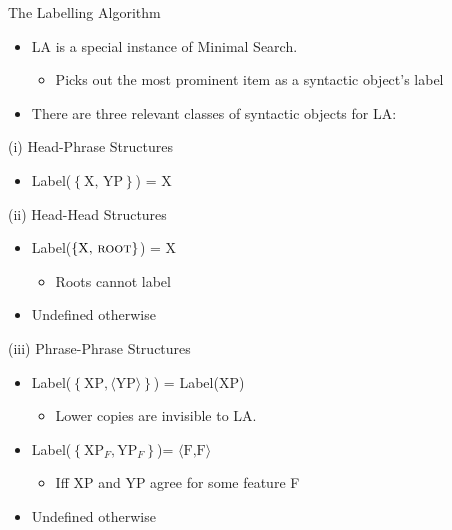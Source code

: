 \documentclass[Proposal]{subfiles}
\begin{document}
\begin{frame}
  {The Labelling Algorithm}
  \begin{itemize}
    \item LA is a special instance of Minimal Search.
      \begin{itemize}
	\item Picks out the most prominent item as a syntactic object's label
      \end{itemize}
      \pause
    \item There are three relevant classes of syntactic objects for LA:
  \end{itemize}
  \begin{overprint}
    \begin{block}
      {(i) Head-Phrase Structures}
      \begin{itemize}
	\item Label($\left\{ \text{X, YP} \right\}$) = X
      \end{itemize}
    \end{block}
    \begin{block}
      {(ii) Head-Head Structures}
      \begin{itemize}
	\item<4-5> Label($\left\{ \text{X, }\textsc{root} \right\}$) = X
	  \begin{itemize}
	    \item<4-5> Roots cannot label
	  \end{itemize}
	\item<5> Undefined otherwise
      \end{itemize}
    \end{block}
    \begin{block}
      {(iii) Phrase-Phrase Structures}
      \begin{itemize}
	\item<6-8> Label($\left\{ \text{XP}, \langle\text{YP}\rangle \right\}$) = Label(XP)
	  \begin{itemize}
	    \item<6-8> Lower copies are invisible to LA.
	  \end{itemize}
	\item<7-8> Label($\left\{ \text{XP}_F, \text{YP}_F \right\}$)= $\langle\text{F,F}\rangle$
	  \begin{itemize}
	    \item<7-8> Iff XP and YP agree for some feature F
	  \end{itemize}
	\item <8> Undefined otherwise
      \end{itemize}
    \end{block}
  \end{overprint}
\end{frame}
\end{document}
